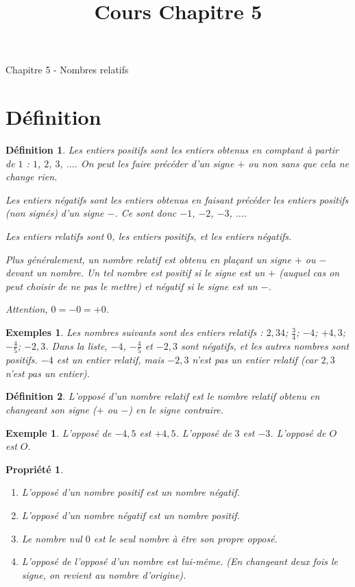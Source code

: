\documentclass[12 pt]{article}
\title{Cours Chapitre 5}
\date{}
\theoremstyle{plain}
\newcounter{n}
\numberwithin{n}{section}
\newtheorem*{prop}{Propriété}
\newtheorem*{df}{Définition}
\newtheorem*{ex}{Exemple}
\newtheorem*{exs}{Exemples}
\begin{document}
\begin{center}{\Large Chapitre 5 - Nombres relatifs}\\ 
 \end{center}

\section{Définition}
\begin{df}
Les \emph{entiers positifs} sont les entiers obtenus en comptant à partir de $1$ : $1$, $2$, $3$, $\ldots$. 
On peut les faire précéder d'un signe $+$ ou non sans que cela ne change rien. 

Les \emph{entiers négatifs} sont les entiers obtenus en faisant précéder les entiers positifs (non signés) d'un signe $-$. Ce sont donc $-1$, $-2$, $-3$, $\ldots$. 

Les \emph{entiers relatifs} sont $0$, les entiers positifs, et les entiers négatifs. 

Plus généralement, un nombre relatif est obtenu en plaçant un signe $+$ ou $-$ devant un nombre. Un tel nombre est 
positif si le signe est un $+$ (auquel cas on peut choisir de ne pas le mettre) et négatif si le signe est un $-$.

Attention, $0 = -0 = + 0$. 
\end{df}
\begin{exs}
Les nombres suivants sont des entiers relatifs : $2,34$; $\frac{3}4$; $-4$; $+4,3$; $-\frac45$; $- 2,3$. Dans la liste, $-4$, $-\frac45$ et $-2,3$ sont négatifs, et les autres nombres sont positifs. $-4$ est un entier relatif, mais 
$-2,3$ n'est pas un entier relatif (car $2,3$ n'est pas un entier). 
\end{exs}

\begin{df}
L'\emph{opposé} d'un nombre relatif est le nombre relatif obtenu en changeant son signe ($+$ ou $-$) en le signe 
contraire. 
\end{df}
\begin{ex}
L'opposé de $-4,5$ est $+4,5$. L'opposé de $3$ est $-3$. L'opposé de $O$ est $O$.
\end{ex}
\begin{prop}
\begin{enumerate}
\item L'opposé d'un nombre positif est un nombre négatif. 
\item L'opposé d'un nombre négatif est un nombre positif. 
\item Le nombre nul $0$ est le seul nombre à être son propre opposé. 
\item L'opposé de l'opposé d'un nombre est lui-même. (En changeant deux fois le signe, on revient au nombre 
d'origine).
\end{enumerate}
\end{prop}
\end{document}
